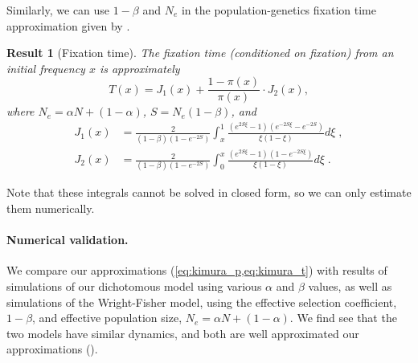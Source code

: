 \documentclass[12pt]{extarticle}
\newtheorem{result}{Result}
\begin{document}
Similarly, we can use $1-\beta$ and $N_e$ in the population-genetics fixation time approximation given by \citet[eq.~17]{kimura_average}.\\

\begin{result}[Fixation time] The fixation time (conditioned on fixation) from an initial frequency $x$ is approximately
\begin{equation} \label{eq:kimura_t}
T(x) = J_1(x) + \frac{1-\pi(x)}{\pi(x)}\cdot J_2(x),
\end{equation}
where $N_e=\alpha N + (1-\alpha)$, $S=N_e(1-\beta)$, and
\begin{equation}
\begin{aligned}
J_1(x) &= \frac{2}{(1-\beta)(1-e^{-2S})}\int_x^1 \frac{(e^{2S\xi}-1)(e^{-2S\xi}-e^{-2S})}{\xi(1-\xi)}d\xi \;, \\
J_2 (x) &= \frac{2}{(1-\beta)(1-e^{-2S})}\int_0^x \frac{(e^{2S\xi}-1)(1-e^{-2S\xi})}{\xi(1-\xi)}d\xi \;.
\end{aligned}
\end{equation}
\end{result}
Note that these integrals cannot be solved in closed form, so we can only estimate them numerically.

\paragraph{Numerical validation.}
We compare our approximations (\cref{eq:kimura_p,eq:kimura_t}) with results of simulations of our dichotomous model using various $\alpha$ and $\beta$ values, as well as simulations of the Wright-Fisher model, using the effective selection coefficient, $1-\beta$, and effective population size, $N_e=\alpha N + (1-\alpha)$. 
We find see that the two models have similar dynamics, and both are well approximated our approximations ().
\end{document}
